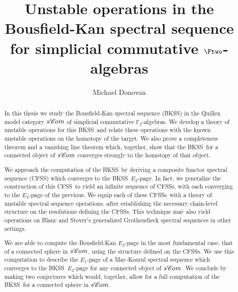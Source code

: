 \documentclass[11pt]{amsart} \renewcommand{\baselinestretch}{1.2}
\title[The Bousfield-Kan spectral sequence for simplicial algebras]{Unstable operations in the Bousfield-Kan spectral sequence for simplicial commutative $\Ftwo$-algebras}
\author[M.\ Donovan]{Michael Donovan}
\theoremstyle{plain}
\numberwithin{equation}{section} %
\theoremstyle{plain}
\numberwithin{equation}{chapter} %
\newcommand{\scrC}{\mathscr{C}}
\newcommand{\F}{\mathbb{F}}
\newcommand{\algs}{{\scrC\!\textit{\normalfont\textit{om}}}}
\newcommand{\BKSS}{BKSS}
\newcommand{\CFSS}{CFSS}
\newcommand{\CFSSs}{CFSSs}
\begin{document}
\begin{Contents Page}
\begin{abstract}
In this thesis we study the Bousfield-Kan spectral sequence (\BKSS) in the Quillen model category $s\algs$ of simplicial commutative $\F_2$-algebras. We develop a  theory of unstable operations for this \BKSS\ and relate these operations with the known unstable operations on the homotopy of the target.
We also prove a completeness theorem  and a vanishing line theorem which, together, show that the \BKSS\ for a connected object of $s\algs$ converges strongly to the homotopy of that object.

We approach the computation of the \BKSS\ by deriving a composite functor spectral sequence (\CFSS) which converges to the \BKSS\ $E_2$-page. In fact, we generalize the construction of this \CFSS\ to yield an infinite sequence of \CFSSs, with each converging to the $E_2$-page of the previous.  We equip each of these \CFSSs\ with a theory of unstable spectral sequence operations, 
after establishing the necessary chain-level structure on the resolutions defining the \CFSSs. This technique may also yield operations on Blanc and Stover's generalized Grothendieck spectral sequences in other settings.

We are able to compute the Bousfield-Kan $E_2$-page in the most fundamental case, that of a connected sphere in $s\algs$, using the structure defined on the \CFSSs. We use this computation to describe the $E_1$-page of a May-Koszul spectral sequence which converges to the \BKSS\ $E_2$-page for any connected object of $s\algs$.
We conclude by making two conjectures which would, together, allow for a full computation of the \BKSS\ for a connected sphere in $s\algs$.
\end{abstract}
\maketitle
\tableofcontents
\end{Contents Page}



\end{document}
